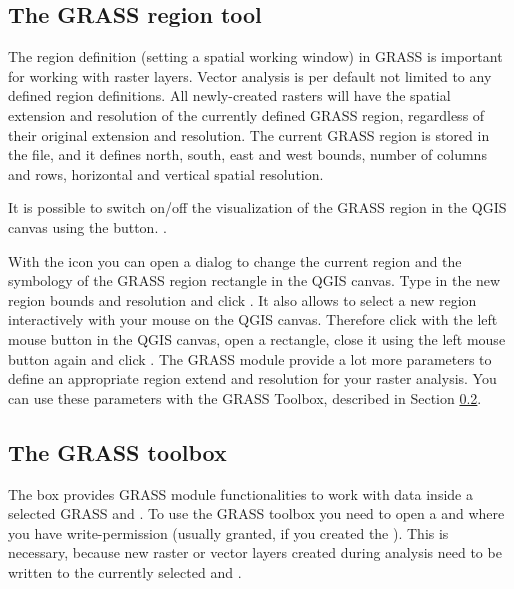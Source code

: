 \subsection{The GRASS region tool}\label{sec:grass_region}

The region definition (setting a spatial working window) in GRASS is important 
for working with raster layers. Vector analysis is per default not limited
to any defined region definitions. All newly-created rasters will have the
spatial extension and resolution of the currently defined GRASS region,
regardless of their original extension and resolution. The current GRASS
region is stored in the  file, and it 
defines north, south, east and west bounds, number of columns and rows, 
horizontal and vertical spatial resolution.

It is possible to switch on/off the visualization of the GRASS region in the
QGIS canvas using the 
button. .

With the  icon you 
can open a dialog to change the current region and the symbology of the GRASS 
region rectangle in the QGIS canvas. Type in the new region bounds and 
resolution and click . It also allows to select a new region 
interactively with your mouse on the QGIS canvas. Therefore click with the 
left mouse button in the QGIS canvas, open a rectangle, close it using the 
left mouse button again and click .
The GRASS module  provide a lot more parameters to define 
an appropriate region extend and resolution for your raster analysis. You can 
use these parameters with the GRASS Toolbox, described in Section 
\ref{subsec:grass_toolbox}.

\subsection{The GRASS toolbox}\label{subsec:grass_toolbox}

The  box provides GRASS module 
functionalities to work with data inside a selected GRASS  
and . To use the GRASS toolbox you need to open a 
 and  where you have write-permission 
(usually granted, if you created the ). This is necessary, 
because new raster or vector layers created during analysis need to be written 
to the currently selected  and .

